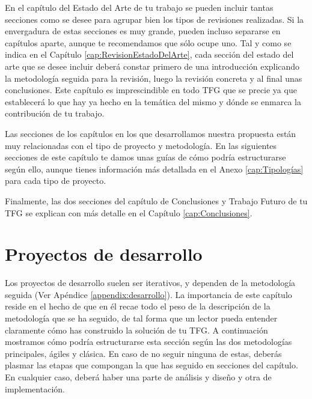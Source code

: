 En el capítulo del Estado del Arte de tu trabajo se pueden incluir tantas secciones como se desee para agrupar bien los tipos de revisiones realizadas. Si la envergadura de estas secciones es muy grande, pueden incluso separarse en capítulos aparte, aunque te recomendamos que sólo ocupe uno. Tal y como se indica en el Capítulo \ref{cap:RevisionEstadoDelArte}, cada sección del estado del arte que se desee incluir deberá constar primero de una introducción explicando la metodología seguida para la revisión, luego la revisión concreta y al final unas conclusiones. Este capítulo es imprescindible en todo TFG que se precie ya que establecerá lo que hay ya hecho en la temática del mismo y dónde se enmarca la contribución de tu trabajo.


Las secciones de los capítulos en los que desarrollamos nuestra propuesta están muy relacionadas con el tipo de proyecto y metodología. En las siguientes secciones de este capítulo te damos unas guías de cómo podría estructurarse según ello, aunque tienes información más detallada en el Anexo \ref{cap:Tipologías} para cada tipo de proyecto.

Finalmente, las dos secciones del capítulo de Conclusiones y Trabajo Futuro de tu TFG se explican con más detalle en el Capítulo \ref{cap:Conclusiones}.

\section{Proyectos de desarrollo}

Los proyectos de desarrollo suelen ser iterativos, y dependen de la metodología seguida (Ver Apéndice \ref{appendix:desarrollo}). La importancia de este capítulo reside en el hecho de que en él recae todo el peso de la descripción de la metodología que se ha seguido, de tal forma que un lector pueda entender claramente cómo has construido la solución de tu TFG. A continuación mostramos cómo podría estructurarse esta sección según las dos  metodologías principales, ágiles y clásica. En caso de no seguir ninguna de estas, deberás plasmar las etapas que compongan la que has seguido en secciones del capítulo. En cualquier caso, deberá haber una parte de análisis y diseño y otra de implementación.

